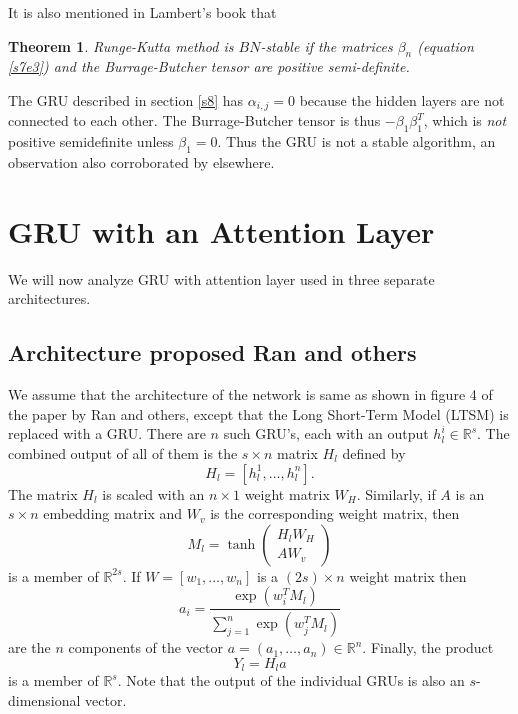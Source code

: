 \documentclass{article}
\numberwithin{equation}{section}
\newtheorem{thm}{Theorem}
\begin{document}
It is also mentioned in Lambert's book \cite{lambert1991numerical} that
\begin{thm}\label{s9t1}
Runge-Kutta method is $BN$-stable if the matrices $\beta_n$ (equation
\eqref{s7e3}) and the Burrage-Butcher tensor are positive semi-definite.
\end{thm}

The GRU described in section \ref{s8} has $\alpha_{i, j} = 0$ because the
hidden layers are not connected to each other. The Burrage-Butcher tensor 
is thus $-\beta_1 \beta_1^T$, which is \emph{not} positive semidefinite 
unless $\beta_1 = 0$.  Thus the GRU is not a stable algorithm, an 
observation also corroborated by elsewhere\cite{kanai2017preventing}.

\section{GRU with an Attention Layer}\label{s10}
We will now analyze GRU with attention layer used in three separate
architectures. 
\subsection{Architecture proposed Ran and others} 
We assume that the architecture of the network is same as shown in figure 4 
of the paper \cite{ran2019lstm} by Ran and others, except that the 
Long Short-Term Model (LTSM) is replaced with a GRU. There are $n$ such 
GRU's, each with an output $h^i_l \in \mathbb{R}^s$. The combined output 
of all of them is the $s \times n$ matrix $H_l$ defined by
\begin{equation}\label{s10e1}
H_l = [h^1_l, \ldots, h^n_l].
\end{equation}
The matrix $H_l$ is scaled with an $n \times 1$  weight matrix $W_H$. 
Similarly, if $A$ is an $s \times n$ embedding matrix and $W_v$ is the
corresponding weight matrix, then
\begin{equation}\label{s10e2}
M_l = \tanh\begin{pmatrix} H_lW_H \\ AW_v \end{pmatrix}
\end{equation}
is a member of $\mathbb{R}^{2s}$. If $W= [w_1, \ldots, w_n]$ is a $(2s) 
\times n$ weight matrix then
\begin{equation}\label{s10e3}
a_i = \frac{\exp(w_i^T M_l)}{\sum_{j=1}^n \exp(w_j^T M_l)}
\end{equation}
are the $n$ components of the vector $a = (a_1, \ldots, a_n)
\in \mathbb{R}^n$. Finally, the product
\begin{equation}\label{s10e4}
Y_l = H_l a
\end{equation}
is a member of $\mathbb{R}^s$. Note that the output of the individual
GRUs is also an $s$-dimensional vector.
\end{document}
